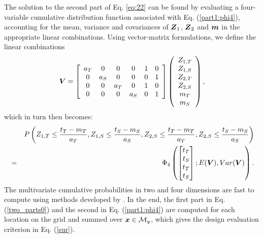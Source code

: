 \documentclass[aoas]{imsart}
\begin{document}
The solution to the second part of Eq. \eqref{eq:22} can be found by evaluating a four-variable cumulative distribution function associated
with Eq. (\ref{part1:phi4}), accounting for the mean, variance and
covariances of ${\boldsymbol Z}_1$, ${\boldsymbol Z}_2$ and ${\boldsymbol m}$ in the appropriate linear
combinations. Using vector-matrix formulations, we define the linear
combinations
\begin{equation}
\label{Vcomb}
    \bV=\left[
    \begin{array}{cccccc}
        a_T & 0 & 0 & 0 & 1 & 0 \\
         0 & a_S & 0 & 0 & 0 & 1 \\
         0 & 0 & a_T & 0 & 1 & 0\\
         0 & 0 & 0 & a_S & 0 & 1\\
    \end{array}
    \right] 
    \left(
    \begin{array}{cccccc}
         Z_{1,T} \\
         Z_{1,S} \\
         Z_{2,T} \\
         Z_{2,S} \\
         m_{T} \\
         m_{S}
    \end{array}
    \right),
\end{equation}
which in turn then becomes:
{\small
\begin{eqnarray}
\label{part1:phi4_2}
&&P \left( Z_{1,T} \leq \frac{t_T-m_{T}}{a_{T}}, 
Z_{1,S} \leq \frac{t_S-m_{S}}{a_{S}}, Z_{2,S} \leq \frac{t_T-m_{T}}{a_{T}}, Z_{2,S} \leq \frac{t_S-m_{S}}{a_{S}} \right)\\
&=&  \Phi_4 
\begin{pmatrix} 
\begin{bmatrix} t_T\\
t_S \\
t_T \\
t_S
\end{bmatrix};
E( \bV),Var(\bV)
\end{pmatrix} \nonumber.
\end{eqnarray}
}
The multivariate cumulative probabilities in two and four dimensions
are fast to compute using methods developed by \cite{genz2009computation}.  In
the end, the first part in Eq. (\ref{two_parts0}) and the second in
Eq. (\ref{part1:phi4}) are computed for each location on the grid and
summed over ${\boldsymbol x} \in \mathcal{M}_g$, which gives the design evaluation
criterion in Eq. (\ref{sur}). 
\end{document}
